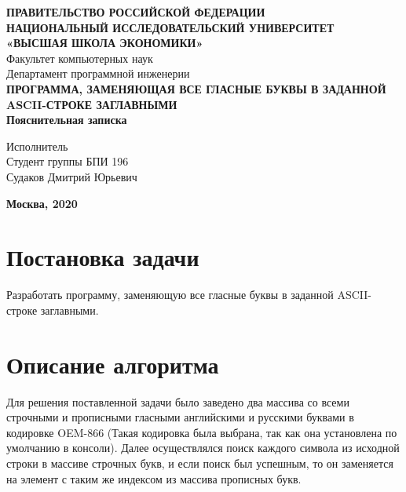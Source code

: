 \documentclass[14pt,a4paper]{article}
\begin{document}
    \begin{titlepage}
        \newpage
         \begin{center}
             {\bfseries \large ПРАВИТЕЛЬСТВО РОССИЙСКОЙ ФЕДЕРАЦИИ\\
             НАЦИОНАЛЬНЫЙ ИССЛЕДОВАТЕЛЬСКИЙ УНИВЕРСИТЕТ\\
             «ВЫСШАЯ ШКОЛА ЭКОНОМИКИ»}\\
             \vspace{1cm}
             {Факультет компьютерных наук\\
             Департамент программной инженерии}\\
             \vspace{6cm}
             {\bfseries \Large  ПРОГРАММА, ЗАМЕНЯЮЩАЯ ВСЕ ГЛАСНЫЕ БУКВЫ В ЗАДАННОЙ ASCII-СТРОКЕ
             ЗАГЛАВНЫМИ}\\
             \vspace{1cm}
             {\bfseries Пояснительная записка}
             \vspace{3cm}
         \end{center}

         \begin{flushright}
             Исполнитель\\
             Студент группы БПИ 196\\
             Судаков Дмитрий Юрьевич
         \end{flushright}
         \vfill
         \begin{center}
             {\bfseries Москва, 2020}
         \end{center}
    \end{titlepage}


    \newpage
    \tableofcontents


    \newpage
    \section{Постановка задачи}
    \par{
        Разработать программу, заменяющую все гласные буквы в заданной ASCII-строке заглавными. 
    }\\
    
    \newpage
    \section{Описание алгоритма}
    \par{
        Для решения поставленной задачи было заведено два массива со всеми строчными и прописными гласными английскими и русскими буквами в кодировке OEM-866 (Такая кодировка была выбрана, так как она установлена по умолчанию в консоли). Далее осуществлялся поиск каждого символа из исходной строки в массиве строчных букв, и если поиск был успешным, то он заменяется на элемент с таким же индексом из массива прописных букв.
    }
\end{document}
